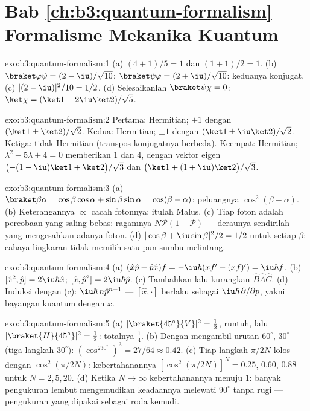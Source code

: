 \section*{Bab \ref{ch:b3:quantum-formalism} --- Formalisme Mekanika Kuantum}

\begin{solution}{exo:b3:quantum-formalism:1}
(a) $(4 + 1)/5 = 1$ dan $(1 + 1)/2 = 1$. (b) $\braket\varphi\psi =
(2 - \iu)/\sqrt{10}$; $\braket\psi\varphi = (2 + \iu)/\sqrt{10}$:
keduanya konjugat. (c) $|(2 - \iu)|^2/10 = 1/2$. (d) Selesaikanlah
$\braket\psi\chi = 0$: $\ket\chi = (\ket1 - 2\iu\ket2)/\sqrt5$.
\end{solution}

\begin{solution}{exo:b3:quantum-formalism:2}
Pertama: Hermitian; $\pm1$ dengan $(\ket1 \pm \ket2)/\sqrt2$. Kedua:
Hermitian; $\pm1$ dengan $(\ket1 \pm \iu\ket2)/\sqrt2$. Ketiga: tidak
Hermitian (transpos-konjugatnya berbeda). Keempat: Hermitian;
$\lambda^2 - 5\lambda + 4 = 0$ memberikan $1$ dan $4$, dengan vektor eigen
$\big({-(1 - \iu)}\ket1 + \ket2\big)/\sqrt3$ dan $\big(\ket1 +
(1 + \iu)\ket2\big)/\sqrt3$.
\end{solution}

\begin{solution}{exo:b3:quantum-formalism:3}
(a) $\braket\beta\alpha = \cos\beta\cos\alpha + \sin\beta\sin\alpha
= \cos(\beta - \alpha)$: peluangnya $\cos^2(\beta - \alpha)$. (b)
Keterangannya $\propto$ cacah fotonnya: itulah Malus. (c) Tiap foton
adalah percobaan yang saling bebas: ragamnya $N\mathcal P(1 - \mathcal P)$ ---
deraunya sendirilah yang mengesahkan adanya foton. (d) $|\cos\beta + \iu\sin\beta|^2/2
= 1/2$ untuk setiap $\beta$: cahaya lingkaran tidak memilih satu pun
sumbu melintang.
\end{solution}

\begin{solution}{exo:b3:quantum-formalism:4}
(a) $(\hat x\hat p - \hat p\hat x)f = -\iu\hbar(xf' - (xf)') =
\iu\hbar f$. (b) $[\hat x^2, \hat p] = 2\iu\hbar\hat x$; $[\hat x,
\hat p^2] = 2\iu\hbar\hat p$. (c) Tambahkan lalu kurangkan $\hat B\hat A
\hat C$. (d) Induksi dengan (c): $\iu\hbar\,n\hat p^{n-1}$ ---
$[\hat x, \cdot]$ berlaku sebagai $\iu\hbar\,\partial/\partial p$, yakni
bayangan kuantum  dengan $x$.
\end{solution}

\begin{solution}{exo:b3:quantum-formalism:5}
(a) $|\braket{45^\circ}{V}|^2 = \tfrac12$, runtuh, lalu
$|\braket{H}{45^\circ}|^2 = \tfrac12$: totalnya $\tfrac14$. (b) Dengan
mengambil urutan $60^\circ$, $30^\circ$ (tiga langkah $30^\circ$):
$(\cos^230^\circ)^3 = 27/64 \approx 0.42$. (c) Tiap langkah
$\pi/2N$ lolos dengan $\cos^2(\pi/2N)$: kebertahanannya $[\cos^2(\pi/2N)]^N
= 0.25$, $0.60$, $0.88$ untuk $N = 2, 5, 20$. (d) Ketika $N \to \infty$
kebertahanannya menuju $1$: banyak pengukuran lembut mengemudikan
keadaannya melewati $90^\circ$ tanpa rugi --- pengukuran yang dipakai
sebagai roda kemudi.
\end{solution}

